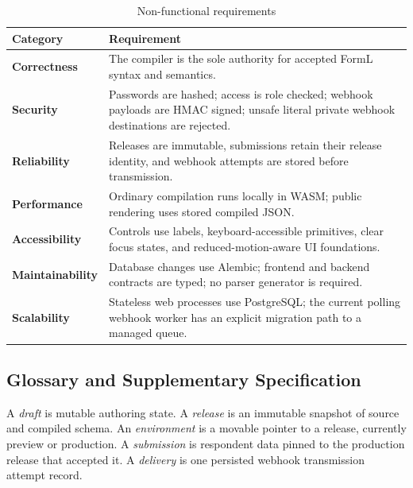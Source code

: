 \documentclass[12pt,a4paper,oneside]{report}
\begin{document}
\begin{table}[H]
\centering
\caption{Non-functional requirements}
\label{tab:nonfunctional}
\begin{tabularx}{\textwidth}{>{\bfseries}p{}X}
\toprule
Category & Requirement\\
\midrule
Correctness & The compiler is the sole authority for accepted FormL syntax and semantics.\\
Security & Passwords are hashed; access is role checked; webhook payloads are HMAC signed; unsafe literal private webhook destinations are rejected.\\
Reliability & Releases are immutable, submissions retain their release identity, and webhook attempts are stored before transmission.\\
Performance & Ordinary compilation runs locally in WASM; public rendering uses stored compiled JSON.\\
Accessibility & Controls use labels, keyboard-accessible primitives, clear focus states, and reduced-motion-aware UI foundations.\\
Maintainability & Database changes use Alembic; frontend and backend contracts are typed; no parser generator is required.\\
Scalability & Stateless web processes use PostgreSQL; the current polling webhook worker has an explicit migration path to a managed queue.\\
\bottomrule
\end{tabularx}
\end{table}

\subsection{Glossary and Supplementary Specification}
A \emph{draft} is mutable authoring state. A \emph{release} is an immutable snapshot of source
and compiled schema. An \emph{environment} is a movable pointer to a release, currently preview
or production. A \emph{submission} is respondent data pinned to the production release that
accepted it. A \emph{delivery} is one persisted webhook transmission attempt record.
\end{document}
